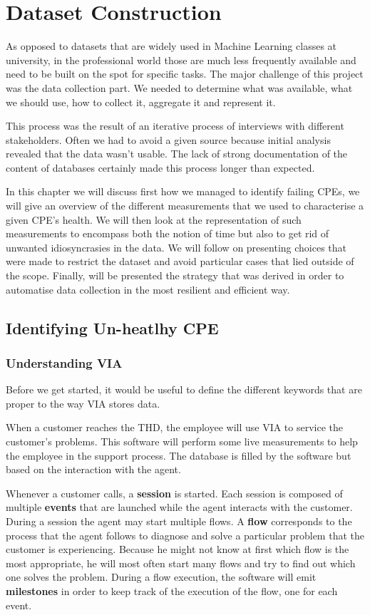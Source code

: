 \chapter{Dataset Construction}
As opposed to datasets that are widely used in Machine Learning classes at university, in the professional world those are much less frequently available and need to be built on the spot for specific tasks. The major challenge of this project was the data collection part. We needed to determine what was available, what we should use, how to collect it, aggregate it and represent it. 

This process was the result of an iterative process of interviews with different stakeholders. Often we had to avoid a given source because initial analysis revealed that the data wasn't usable. The lack of strong documentation of the content of databases certainly made this process longer than expected.

In this chapter we will discuss first how we managed to identify failing CPEs, we will give an overview of the different measurements that we used to characterise a given CPE's health. We will then look at the representation of such measurements to encompass both the notion of time but also to get rid of unwanted idiosyncrasies in the data. We will follow on presenting choices that were made to restrict the dataset and avoid particular cases that lied outside of the scope. Finally, will be presented the strategy that was derived in order to automatise data collection in the most resilient and efficient way.

\section{Identifying Un-heatlhy CPE}
\subsection{Understanding VIA}
Before we get started, it would be useful to define the different keywords that are proper to the way VIA stores data. 

When a customer reaches the THD, the employee will use VIA to service the customer's problems. This software will perform some live measurements to help the employee in the support process. The database is filled by the software but based on the interaction with the agent. 

Whenever a customer calls, a \textbf{session} is started. Each session is composed of multiple \textbf{events} that are launched while the agent interacts with the customer. During a session the agent may start multiple flows. A \textbf{flow} corresponds to the process that the agent follows to diagnose and solve a particular problem that the customer is experiencing. Because he might not know at first which flow is the most appropriate, he will most often start many flows and try to find out which one solves the problem. During a flow execution, the software will emit \textbf{milestones} in order to keep track of the execution of the flow, one for each event. 

